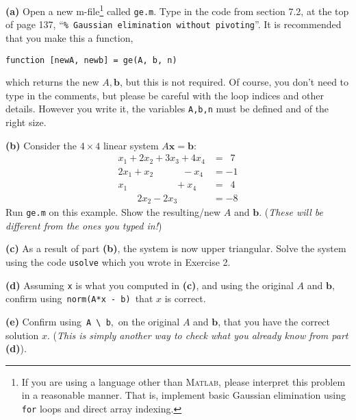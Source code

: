 \documentclass[12pt]{amsart}
\newcommand{\bb}{\mathbf{b}}
\newcommand{\bx}{\mathbf{x}}
\newcommand{\Matlab}{\textsc{Matlab}\xspace}
\newcommand{\epart}[1]{\medskip\noindent\textbf{(#1)}\quad }
\begin{document}
\epart{a}  Open a new m-file\footnote{If you are using a language other than \Matlab, please interpret this problem in a reasonable manner.  That is, implement basic Gaussian elimination using \texttt{for} loops and direct array indexing.} called \texttt{ge.m}.  Type in the code from section 7.2, at the top of page 137, ``\verb|% Gaussian elimination without pivoting|''.  It is recommended that you make this a function,

\verb|function [newA, newb] = ge(A, b, n)|

\noindent which returns the new $A,\bb$, but this is not required.  Of course, you don't need to type in the comments, but please be careful with the loop indices and other details.  However you write it, the variables \texttt{A,b,n} must be defined and of the right size.

\epart{b} Consider the $4\times 4$ linear system $A\bx = \bb$:
\begin{align*}
x_1 + 2 x_2 + 3 x_3 + 4 x_4    &= \,\,\, 7 \\
2 x_1 + x_2 \quad \qquad - x_4 &= - 1 \\
x_1 \quad \qquad \qquad + x_4  &= \,\,\, 4 \\
\qquad 2 x_2 - 2 x_3 \qquad    &= - 8
\end{align*}
Run \texttt{ge.m} on this example.  Show the resulting/new $A$ and $\bb$.  (\emph{These will be different from the ones you typed in!})

\epart{c} As a result of part \textbf{(b)}, the system is now upper triangular.  Solve the system using the code \texttt{usolve} which you wrote in Exercise 2.

\epart{d}  Assuming \verb|x| is what you computed in \textbf{(c)}, and using the original $A$ and $\bb$, confirm using  \,\verb|norm(A*x - b)|\, that $x$ is correct.

\epart{e}  Confirm using \,\verb|A \ b|,\, on the original $A$ and $\bb$, that you have the correct solution $x$.  (\emph{This is simply another way to check what you already know from part} \textbf{(d)}).
\end{document}
